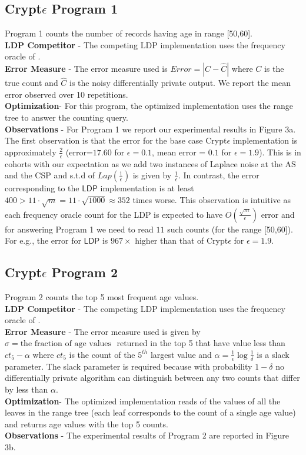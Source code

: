\subsection*{Crypt$\epsilon$ Program 1}
Program 1 counts the number of records having age in range [50,60].  
\\\textbf{\textsf{LDP} Competitor} - The competing \textsf{LDP} implementation uses the frequency oracle of \cite{LDP1}. 
\\\textbf{Error Measure} - The error measure used is  $Error = |C-\hat{C}|$ where $C$ is the true count and $\hat{C}$ is the noisy differentially private output. We report the mean error observed over 10 repetitions. \\
\textbf{Optimization}- For this program, the optimized implementation uses the range tree to answer the counting query.
\\\textbf{Observations} - For Program 1 we report our experimental results in Figure 3a. The first observation is that the error for the base case Crypt$\epsilon$ implementation is approximately $\frac{2}{\epsilon}$ (error=$17.60$ for $\epsilon=0.1$, mean error = $0.1$ for $\epsilon=1.9$). This is in cohorts with our expectation as we add two instances of Laplace noise at the \textsf{AS} and the \textsf{CSP} and s.t.d of $Lap(\frac{1}{\epsilon})$ is given by $\frac{1}{\epsilon}$. In contrast, the error corresponding to the $\textsf{LDP}$ implementation is at least $400 >11\cdot \sqrt{m}=  11\cdot \sqrt{1000} \approx 352$ times worse. This observation is intuitive as each frequency oracle count for the \textsf{LDP} is expected to have $O(\frac{\sqrt{m}}{\epsilon})$ error and for answering Program 1 we need to read $11$  such counts (for the range [50,60]). For e.g., the error for $\textsf{LDP}$ is $967 \times$  higher than that of Crypt$\epsilon$ for $\epsilon=1.9$.  
\subsection*{Crypt$\epsilon$ Program 2}
Program 2 counts the top 5 most frequent age values.
\\\textbf{\textsf{LDP} Competitor} - The competing \textsf{LDP} implementation uses the frequency oracle of \cite{LDP1}. 
\\\textbf{Error Measure} - The error measure used is given by $\sigma= \text{the fraction of age values }$ returned in the top 5 that have value less than $ct_5-\alpha$  where  $ct_5$ is the count of the $5^{th}$ largest value and $\alpha=\frac{1}{\epsilon}\log\frac{1}{\delta}$ is a slack parameter. The slack parameter is required because with probability $1-\delta$ no differentially private algorithm can distinguish between any two counts that differ by less than $\alpha$. \\
\textbf{Optimization}- The optimized implementation reads of the values of all the leaves in  the range tree (each leaf corresponds to the count of a single age value) and returns age values with the top 5 counts.
\\\textbf{Observations} - The experimental results of  Program  2 are reported in  Figure 3b. 

